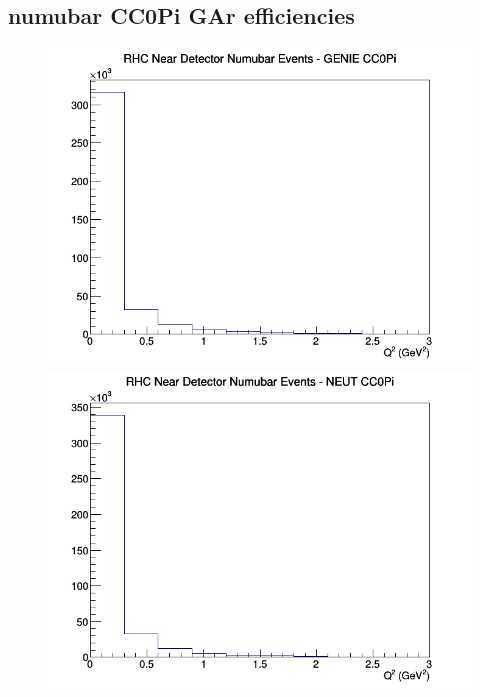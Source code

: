 \documentclass[12pt]{article}
\begin{document}
\subsection{numubar CC0Pi GAr efficiencies}
\begin{figure}[h]
\includegraphics[width=\linewidth]{eff_Q2/GAr/CC0Pi_RHC_ND_numubar_Q2_GENIE.png}
\endminipage
{}
\includegraphics[width=\linewidth]{eff_Q2/GAr/CC0Pi_RHC_ND_numubar_Q2_NEUT.png}
\endminipage
{}

\end{figure}
\end{document}
